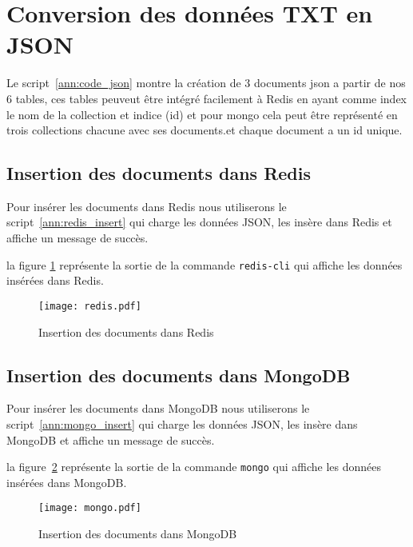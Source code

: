 \section{Conversion des données TXT en JSON}

Le script~\ref{ann:code_json} montre la création de 3 documents json a partir de nos 6 tables, ces tables peuveut être intégré facilement à Redis en ayant comme index le nom de la collection et indice (id) et pour mongo cela peut être représenté en trois collections chacune avec ses documents.\@ et chaque document a un id unique.

\subsection{Insertion des documents dans Redis}

Pour insérer les documents dans Redis nous utiliserons le script~\ref{ann:redis_insert} qui charge les données JSON, les insère dans Redis et affiche un message de succès.

la figure \ref{fig:redis_insert} représente la sortie de la commande \texttt{redis-cli} qui affiche les données insérées dans Redis.

\begin{figure}[H]
  \centering
  \texttt{[image: redis.pdf]}
  \caption{Insertion des documents dans Redis}
  \label{fig:redis_insert}
\end{figure}

\subsection{Insertion des documents dans MongoDB}

Pour insérer les documents dans MongoDB nous utiliserons le script~\ref{ann:mongo_insert} qui charge les données JSON, les insère dans MongoDB et affiche un message de succès.

la figure~\ref{fig:mongo_insert} représente la sortie de la commande \texttt{mongo} qui affiche les données insérées dans MongoDB.\@

\begin{figure}[H]
  \centering
  \texttt{[image: mongo.pdf]}
  \caption{Insertion des documents dans MongoDB}
  \label{fig:mongo_insert}
\end{figure}
